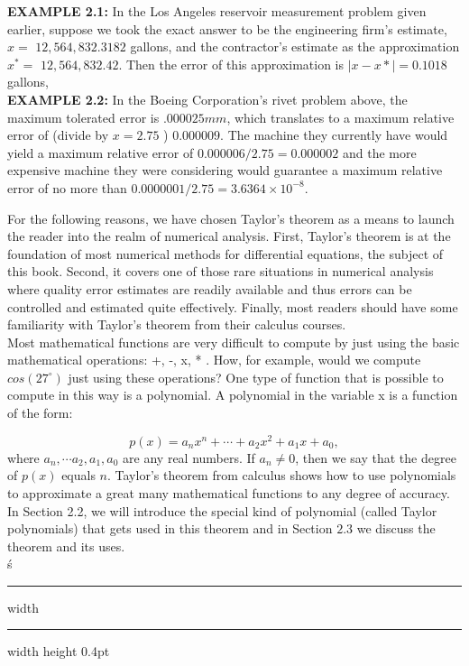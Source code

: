 \documentclass[../main.tex]{subfiles}
\begin{document}
\textbf {EXAMPLE 2.1:} In the Los Angeles reservoir measurement problem given earlier, suppose we took the exact answer to be the engineering firm's estimate, $x=$ $12,564,832.3182$ gallons, and the contractor's estimate as the approximation $x^{*}=$ $12,564,832.42$. Then the error of this approximation is $\left|x-x*\right|=0.1018$ gallons,\\

\textbf {EXAMPLE 2.2:} In the Boeing Corporation's rivet problem above, the maximum tolerated error is $.000025 mm$, which translates to a maximum relative error of (divide by $x=2.75$ ) $0.000009$. The machine they currently have would yield a maximum relative error of $0.000006 / 2.75=0.000002$ and the more expensive machine they were considering would guarantee a maximum relative error of no more than $0.0000001 / 2.75=3.6364 \times 10^{-8}$.

For the following reasons, we have chosen Taylor's theorem as a means to launch 
the reader into the realm of numerical analysis. First, Taylor's theorem is at the 
foundation of most numerical methods for differential equations, the subject of this 
book. Second, it covers one of those rare situations in numerical analysis where 
quality error estimates are readily available and thus errors can be controlled and 
estimated quite effectively. Finally, most readers should have some familiarity 
with Taylor's theorem from their calculus courses.\\

Most mathematical functions are very difficult to compute by just using the basic 
mathematical operations: +, -, x, * . How, for example, would we compute
$cos(27^{\circ})$ just using these operations? One type of function that is possible to 
compute in this way is a polynomial. A polynomial in the variable x is a function 
of the form: 

$$
p(x)=a_{n} x^{n}+\cdots+a_{2} x^{2}+a_{1} x+a_{0},
$$
where $a_{n}, \cdots a_{2}, a_{1}, a_{0}$ are any real numbers. If $a_{n} \neq 0$, then we say that the degree of $p(x)$ equals $n$. Taylor's theorem from calculus shows how to use polynomials to approximate a great many mathematical functions to any degree of accuracy. In Section 2.2, we will introduce the special kind of polynomial (called Taylor polynomials) that gets used in this theorem and in Section $2.3$ we discuss the theorem and its uses.\\
ś
\hrule width \hsize \kern 1pt \hrule width \hsize height 0.4pt

\hspace{0.1cm}
\end{document}
